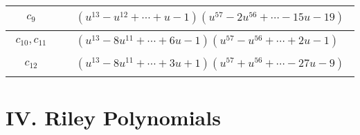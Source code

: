 \documentclass[1p]{elsarticle_modified}
\theoremstyle{definition}
\begin{document}
\begin{tabular}{m{50pt}|m{274pt}}
\hline $$\begin{aligned}c_{9}\end{aligned}$$&$\begin{aligned}
&(u^{13}- u^{12}+\cdots+u-1)(u^{57}-2 u^{56}+\cdots-15 u-19)
\end{aligned}$\\
\hline $$\begin{aligned}c_{10},c_{11}\end{aligned}$$&$\begin{aligned}
&(u^{13}-8 u^{11}+\cdots+6 u-1)(u^{57}- u^{56}+\cdots+2 u-1)
\end{aligned}$\\
\hline $$\begin{aligned}c_{12}\end{aligned}$$&$\begin{aligned}
&(u^{13}-8 u^{11}+\cdots+3 u+1)(u^{57}+u^{56}+\cdots-27 u-9)
\end{aligned}$\\
\hline
\end{tabular}\newpage\renewcommand{\arraystretch}{1}
\centering \section*{ IV. Riley Polynomials}
\end{document}
